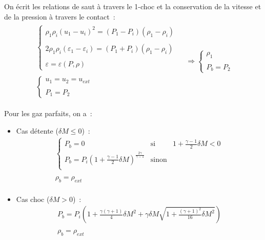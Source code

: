 \begin{enumerate}
On \'ecrit les relations de saut \`a travers le 1-choc
et la conservation de la vitesse et de la pression \`a travers le contact~:
\begin{equation}
\begin{array}{lll}
\begin{array}{l}
\left\{\begin{array}{l}
\rho_1 \rho_i (u_1 - u_i)^2
= (P_1 - P_i)(\rho_1 - \rho_i)\\
\\
2\rho_1 \rho_i (\varepsilon_1 - \varepsilon_i)
= (P_1 + P_i)(\rho_1 - \rho_i)\\
\\
\varepsilon = \varepsilon(P,\rho)
\end{array}\right.\\
\\
\left\{\begin{array}{l}
u_1 = u_2 = u_{ext}\\
\\
P_1 = P_2
\end{array}\right.
\end{array}
&
\Rightarrow
\left\{\begin{array}{l}
\rho_1\\
\\
P_b = P_2
\end{array}\right.
\end{array}
\end{equation}

\bigskip
Pour les gaz parfaits, on a~:

\begin{itemize}

\item Cas d\'etente ($\delta M \leqslant 0$)~:\\
$$
\begin{array}{l}
\left\{\begin{array}{lll}
P_b=0 & \text{si} & 1 + \displaystyle\frac{\gamma-1}{2}\delta M<0\\
P_b = P_i \left(1 + \displaystyle\frac{\gamma-1}{2}\delta M\right)
^{\frac{2\gamma}{\gamma-1}} & \text{sinon}\\
\end{array}\right.\\
\\
\rho_b= \rho_{ext}\\
\end{array}
$$

\item Cas choc ($\delta M > 0$)~:\\
$$
\begin{array}{l}
P_b = P_i \left(1 + \displaystyle\frac{\gamma(\gamma+1)}{4}\delta M^2
+\gamma \delta M \displaystyle\sqrt{1+\displaystyle\frac{(\gamma+1)^2}{16}\delta M^2}\right)
\\
\\
\rho_b=\rho_{ext}\\
\end{array}
$$

\end{itemize}

\end{enumerate}


